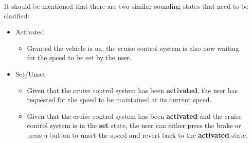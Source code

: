 \documentclass[preprint,11pt,3p]{article}
\begin{document}
It should be mentioned that there are two similar sounding states that need to be clarified:
\begin{itemize}
	\item Activated
		\begin{itemize}
			\item Granted the vehicle is on, the cruise control system is also now waiting for the speed to be set by the user.
		\end{itemize}
	\item Set/Unset
		\begin{itemize}
			\item Given that the cruise control system has been \textbf{activated}, the user has requested for the speed to be maintained at its current speed.
			\item Given that the cruise control system has been \textbf{activated} and the cruise control system is in the \textbf{set} state, the user can either press the brake or press a button to unset the speed and revert back to the \textbf{activated} state.
		\end{itemize}
\end{itemize}
\end{document}
